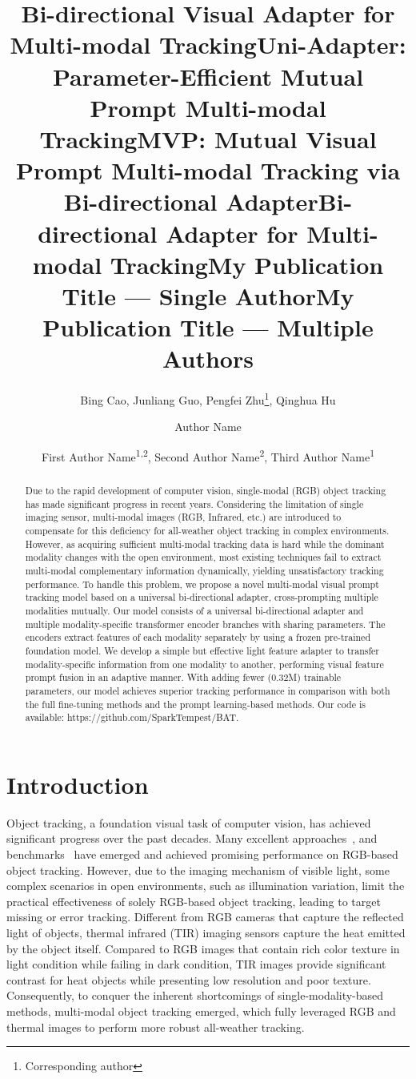 \documentclass[letterpaper]{article} %
\title{Bi-directional Visual Adapter for Multi-modal Tracking}
\title{Uni-Adapter: }
\title{Parameter-Efficient Mutual Prompt Multi-modal Tracking}
\title{MVP: Mutual Visual Prompt Multi-modal Tracking via Bi-directional Adapter}
\title{Bi-directional Adapter for Multi-modal Tracking}
\author{
    Bing Cao,
    Junliang Guo,
    Pengfei Zhu\thanks{Corresponding author},
    Qinghua Hu
}
\title{My Publication Title --- Single Author}
\author {
    Author Name
}
\title{My Publication Title --- Multiple Authors}
\author {
    First Author Name\textsuperscript{\rm 1,\rm 2},
    Second Author Name\textsuperscript{\rm 2},
    Third Author Name\textsuperscript{\rm 1}
}
\begin{document}
\maketitle


\begin{abstract}
Due to the rapid development of computer vision, single-modal (RGB) object tracking has made significant progress in recent years. Considering the limitation of single imaging sensor, multi-modal images (RGB, Infrared, etc.) are introduced to compensate for this deficiency for all-weather object tracking in complex environments. However, as acquiring sufficient multi-modal tracking data is hard while the dominant modality changes with the open environment, most existing techniques fail to extract multi-modal complementary information dynamically, yielding unsatisfactory tracking performance. To handle this problem, we propose a novel multi-modal visual prompt tracking model based on a universal bi-directional adapter, cross-prompting multiple modalities mutually. Our model consists of a universal bi-directional adapter and multiple modality-specific transformer encoder branches with sharing parameters. The encoders extract features of each modality separately by using a frozen pre-trained foundation model. We develop a simple but effective light feature adapter to transfer modality-specific information from one modality to another, performing visual feature prompt fusion in an adaptive manner. With adding fewer (0.32M) trainable parameters, our model achieves superior tracking performance in comparison with both the full fine-tuning methods and the prompt learning-based methods. Our code is available: https://github.com/SparkTempest/BAT.


\end{abstract}

\section{Introduction}

Object tracking, a foundation visual task of computer vision, has achieved significant progress over the past decades. Many excellent approaches~\cite{JMMC,ProTrack,ADRNet,DMCNet,zhu2023visual}, and benchmarks~\cite{GTOT,rgbt234,LasHeR,HMFT} have emerged and achieved promising performance on RGB-based object tracking. 
However, due to the imaging mechanism of visible light, some complex scenarios in open environments, such as illumination variation, limit the practical effectiveness of solely RGB-based object tracking, leading to target missing or error tracking.
Different from RGB cameras that capture the reflected light of objects, thermal infrared (TIR) imaging sensors capture the heat emitted by the object itself. 
Compared to RGB images that contain rich color texture in light condition while failing in dark condition,  TIR images provide significant contrast for heat objects while presenting low resolution and poor texture.
Consequently, to conquer the inherent shortcomings of single-modality-based methods, multi-modal object tracking emerged, which fully leveraged RGB and thermal images to perform more robust all-weather tracking.
\end{document}

